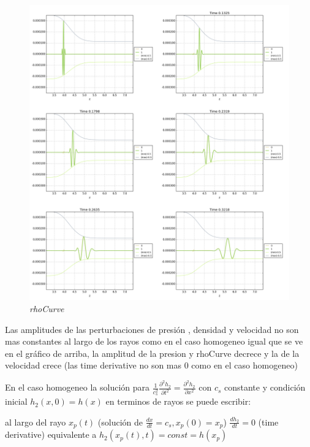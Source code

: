 \documentclass{article}
\begin{document}
\begin{description}
\item \begin{figure}[!ht]
 \centering
 \includegraphics[scale=0.2]{rhocinhom1.png}
 \caption{\emph{rhoCurve}}
\end{figure}

\item Las amplitudes de las perturbaciones de presión , densidad y velocidad  no son mas constantes al largo de los rayos como en el caso homogeneo igual que se ve en el gráfico de arriba, la amplitud de la presion y rhoCurve decrece y la de la velocidad crece (las time derivative  no son mas 0 como en el caso homogeneo)
\item En el caso homogeneo la solución para $\frac{1}{c_s^{2}} \frac{\partial^{2} h_2}{\partial t^{2}} = \frac{ \partial^{2} h_2}{\partial x^2}   $ con $c_s$ constante  y condición inicial $h_2(x,0) = h(x)$ en terminos de rayos se puede escribir:
\item al largo del rayo $x_p(t)$ (solución de $\frac{dx}{dt} = c_s, x_p(0) = x_p$) $\frac{dh_2}{dt} = 0$ (time derivative)
equivalente a $h_2(x_p(t), t) = const = h(x_p)$  

\end{description}
\end{document}
